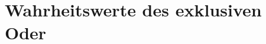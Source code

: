 \documentclass[main.tex]{subfiles}
\begin{document}
\section{Wahrheitswerte des exklusiven Oder}

\FormulaThmAuto{\top\lxor \top \eqvdash \bot}
\begin{tabproofsplit}
  \proofpart{$\vdash$}
    \proofstep{}{\top}{\FormulaRefAuto{\top}}
  \closeproofpart

  \proofpart{$\dashv$}
    \proofstep{}{\top}{\FormulaRefAuto{\top}}
  \closeproofpart
\end{tabproofsplit}

\FormulaThmAuto{\top\lxor \bot \eqvdash \top}
\begin{tabproofsplit}
  \proofpart{$\vdash$}
    \proofstep{}{\top}{\FormulaRefAuto{\top}}
  \closeproofpart

  \proofpart{$\dashv$}
  \closeproofpart
\end{tabproofsplit}

\FormulaThmAuto{\bot\lxor \top \eqvdash \top}
\begin{tabproofsplit}
  \proofpart{$\vdash$}
    \proofstep{}{\top}{\FormulaRefAuto{\top}}
  \closeproofpart

  \proofpart{$\dashv$}
  \closeproofpart
\end{tabproofsplit}

\FormulaThmAuto{\bot\lxor \bot \eqvdash \bot}
\begin{tabproofsplit}
  \proofpart{$\vdash$}
  \closeproofpart

  \proofpart{$\dashv$}
    \proofstep{}{\top}{\FormulaRefAuto{\top}}
  \closeproofpart
\end{tabproofsplit}
\end{document}
